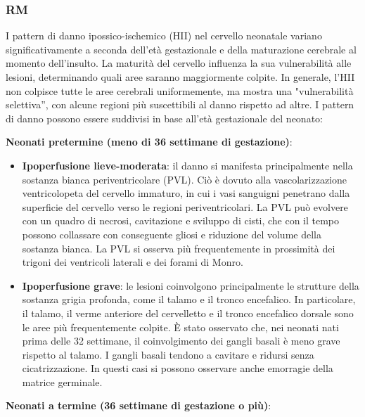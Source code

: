 \subsubsection{RM}

I pattern di danno ipossico-ischemico (HII) nel cervello neonatale variano significativamente a seconda dell'età gestazionale e della maturazione cerebrale al momento dell'insulto. La maturità del cervello influenza la sua vulnerabilità alle lesioni, determinando quali aree saranno maggiormente colpite. In generale, l'HII non colpisce tutte le aree cerebrali uniformemente, ma mostra una "vulnerabilità selettiva'', con alcune regioni più suscettibili al danno rispetto ad altre. I pattern di danno possono essere suddivisi in base all'età gestazionale del neonato:

\textbf{Neonati pretermine (meno di 36 settimane di gestazione)}:

\begin{itemize}
	\tightlist
	\item
	\textbf{Ipoperfusione lieve-moderata}: il danno si manifesta principalmente nella sostanza bianca periventricolare (PVL). Ciò è dovuto alla vascolarizzazione ventricolopeta del cervello immaturo, in cui i vasi sanguigni penetrano dalla superficie del cervello verso le regioni periventricolari. La PVL può evolvere con un quadro di necrosi, cavitazione e sviluppo di cisti, che con il tempo possono collassare con conseguente gliosi e riduzione del volume della sostanza bianca. La PVL si osserva più frequentemente in prossimità dei trigoni dei ventricoli laterali e dei forami di Monro.
	\item
	\textbf{Ipoperfusione grave}: le lesioni coinvolgono principalmente le strutture della sostanza grigia profonda, come il talamo e il tronco encefalico. In particolare, il talamo, il verme anteriore del cervelletto e il tronco encefalico dorsale sono le aree più frequentemente colpite. È stato osservato che, nei neonati nati prima delle 32 settimane, il coinvolgimento dei gangli basali è meno grave rispetto al talamo. I gangli basali tendono a cavitare e ridursi senza cicatrizzazione. In questi casi si possono osservare anche emorragie della matrice germinale.
\end{itemize}

\textbf{Neonati a termine (36 settimane di gestazione o più)}:

